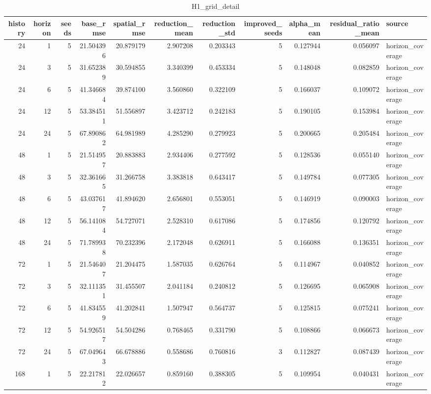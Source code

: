\begin{table}
\caption{H1_grid_detail}
\label{tab:H1_grid_detail}
\begin{tabular}{rrrrrrrrrrl}
\toprule
history & horizon & seeds & base\_rmse & spatial\_rmse & reduction\_mean & reduction\_std & improved\_seeds & alpha\_mean & residual\_ratio\_mean & source \\
\midrule
24 & 1 & 5 & 21.504396 & 20.879179 & 2.907208 & 0.203343 & 5 & 0.127944 & 0.056097 & horizon\_coverage \\
24 & 3 & 5 & 31.652389 & 30.594855 & 3.340399 & 0.453334 & 5 & 0.148048 & 0.082859 & horizon\_coverage \\
24 & 6 & 5 & 41.346684 & 39.874100 & 3.560860 & 0.322109 & 5 & 0.166037 & 0.109072 & horizon\_coverage \\
24 & 12 & 5 & 53.384511 & 51.556897 & 3.423712 & 0.242183 & 5 & 0.190105 & 0.153984 & horizon\_coverage \\
24 & 24 & 5 & 67.890862 & 64.981989 & 4.285290 & 0.279923 & 5 & 0.200665 & 0.205484 & horizon\_coverage \\
48 & 1 & 5 & 21.514957 & 20.883883 & 2.934406 & 0.277592 & 5 & 0.128536 & 0.055140 & horizon\_coverage \\
48 & 3 & 5 & 32.361665 & 31.266758 & 3.383818 & 0.643417 & 5 & 0.149784 & 0.077305 & horizon\_coverage \\
48 & 6 & 5 & 43.037617 & 41.894620 & 2.656801 & 0.553051 & 5 & 0.146919 & 0.090003 & horizon\_coverage \\
48 & 12 & 5 & 56.141084 & 54.727071 & 2.528310 & 0.617086 & 5 & 0.174856 & 0.120792 & horizon\_coverage \\
48 & 24 & 5 & 71.789938 & 70.232396 & 2.172048 & 0.626911 & 5 & 0.166088 & 0.136351 & horizon\_coverage \\
72 & 1 & 5 & 21.546407 & 21.204475 & 1.587035 & 0.626764 & 5 & 0.114967 & 0.040852 & horizon\_coverage \\
72 & 3 & 5 & 32.111351 & 31.455507 & 2.041184 & 0.240812 & 5 & 0.126695 & 0.065908 & horizon\_coverage \\
72 & 6 & 5 & 41.834559 & 41.202841 & 1.507947 & 0.564737 & 5 & 0.125815 & 0.075241 & horizon\_coverage \\
72 & 12 & 5 & 54.926517 & 54.504286 & 0.768465 & 0.331790 & 5 & 0.108866 & 0.066673 & horizon\_coverage \\
72 & 24 & 5 & 67.049643 & 66.678886 & 0.558686 & 0.760816 & 3 & 0.112827 & 0.087439 & horizon\_coverage \\
168 & 1 & 5 & 22.217812 & 22.026657 & 0.859160 & 0.388305 & 5 & 0.109954 & 0.040431 & horizon\_coverage \\

\end{tabular}
\end{table}

